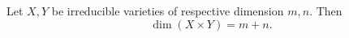 Let $X, Y$ be irreducible varieties of respective dimension $m, n$. Then
$$\dim(X \times Y) = m + n.$$
